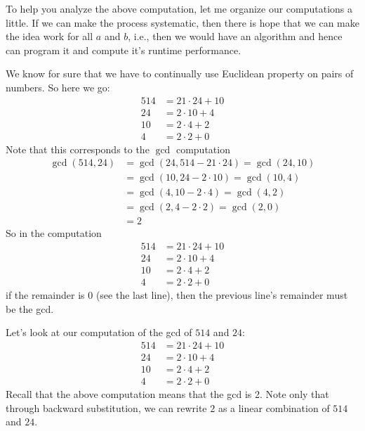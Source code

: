 


To help you analyze the above computation,
let me organize our computations a little.
If we can make the process systematic, then there is hope that we can 
make the idea work for all $a$ and $b$, i.e., then we would have an
algorithm and hence can program it and compute it's runtime performance.

We know for sure that we have to continually use
Euclidean property on pairs of numbers.
So here we go:
\begin{align*}
514 &= 21 \cdot 24 + 10 \\
24  &= 2 \cdot 10 + 4 \\
10  &= 2 \cdot 4 + 2 \\
4   &= 2 \cdot 2 + 0
\end{align*}
Note that this corresponds to the $\gcd$ computation
\begin{align*}
\gcd(514, 24) 
&= \gcd(24, 514 - 21 \cdot 24) = \gcd(24, 10) \\
&= \gcd(10, 24 - 2 \cdot 10) = \gcd(10, 4) \\
&= \gcd(4, 10 - 2 \cdot 4) = \gcd(4, 2)  \\
&= \gcd(2, 4 - 2\cdot 2) = \gcd(2, 0) \\
&= 2
\end{align*}
So in the computation
\begin{align*}
514 &= 21 \cdot 24 + 10 \\
24  &= 2 \cdot 10 + 4 \\
10  &= 2 \cdot 4 + 2 \\
4   &= 2 \cdot 2 + 0
\end{align*}
if the remainder is $0$ (see the last line), 
then the previous line's remainder must be the gcd.

Let's look at our computation of the gcd of $514$ and $24$:
\begin{align*}
514 &= 21 \cdot 24 + 10 \\
24  &= 2 \cdot 10 + 4 \\
10  &= 2 \cdot 4 + 2 \\
4   &= 2 \cdot 2 + 0
\end{align*}
Recall that the above computation means that the gcd is 2.
Note only that through backward substitution, we can rewrite
$2$ as a linear combination of $514$ and $24$.

